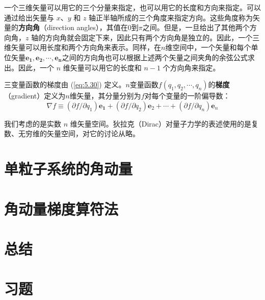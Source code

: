     一个三维矢量可以用它的三个分量来指定，也可以用它的长度和方向来指定。可以通过给出矢量与 $x$、$y$ 和 $z$ 轴正半轴所成的三个角度来指定方向。这些角度称为矢量的\textbf{方向角}（direction angles），其值在$0$到$\pi$之间。但是，一旦给出了其他两个方向角，$z$ 轴的方向角就会固定下来，因此只有两个方向角是独立的。因此，一个三维矢量可以用长度和两个方向角来表示。同样，在$n$维空间中，一个矢量和每个单位矢量$\mathbf{e_1},\mathbf{e_2},\cdots,\mathbf{e_n}$之间的方向角也可以根据上述两个矢量之间夹角的余弦公式求出。因此，一个 $n$ 维矢量可以用它的长度和 $n-1$ 个方向角来指定。

    三变量函数的梯度由 (\ref{eq:5.30}) 定义。$n$变量函数$f\left(q_1,q_2,\cdots,q_n\right)$的\textbf{梯度}（gradient）定义为$n$维矢量，其分量分别为$f$对每个变量的一阶偏导数：
    \begin{equation*}
        \nabla f \equiv \left(\partial f/\partial q_1\right)\mathbf{e_1} + \left(\partial f/\partial q_2\right)\mathbf{e}_2 + \cdots + \left(\partial f/\partial q_n\right)\mathbf{e}_n
    \end{equation*}

    我们考虑的是实数 $n$ 维矢量空间。狄拉克（Dirac）对量子力学的表述使用的是复数、无穷维的矢量空间，对它的讨论从略。
















\section{单粒子系统的角动量}
\label{sec:5.3 Angular Momentum of a One-Particle System}

\section{角动量梯度算符法}
\label{sec:5.4 The Ladder-Operator Method for Angular Momentum}

\section*{总结}

\section*{习题}